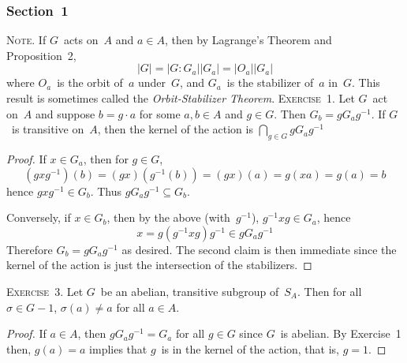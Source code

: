 \documentclass[letterpaper]{article}
\newcommand{\exercise}[1]{\goodbreak\noindent\textsc{Exercise~{#1}.}}
\newcommand{\note}{\goodbreak\noindent\textsc{Note.}}
\newcommand{\bigsect}{\bigcap}
\newcommand{\ord}[1]{|{#1}|}
\newcommand{\gindex}[2]{|{#1}:{#2}|}
\begin{document}
\subsubsection*{Section~1}
\note
If $G$~acts on~$A$ and $a\in A$, then by Lagrange's Theorem and Proposition~2,
$$\ord{G}=\gindex{G}{G_a}\ord{G_a}=\ord{O_a}\ord{G_a}$$
where $O_a$~is the orbit of~$a$ under~$G$, and $G_a$~is the stabilizer of~$a$ in~$G$. This result is sometimes called the \emph{Orbit-Stabilizer Theorem}.
\bigskip
\exercise{1}
Let $G$~act on~$A$ and suppose $b=g\cdot a$ for some $a,b\in A$ and $g\in G$. Then $G_b=gG_ag^{-1}$. If $G$~is transitive on~$A$, then the kernel of the action is $\bigsect_{g\in G}gG_ag^{-1}$
\begin{proof}
If $x\in G_a$, then for $g\in G$,
$$(gxg^{-1})(b)=(gx)(g^{-1}(b))=(gx)(a)=g(xa)=g(a)=b$$
hence $gxg^{-1}\in G_b$. Thus $gG_ag^{-1}\subseteq G_b$.

Conversely, if $x\in G_b$, then by the above (with~$g^{-1}$), $g^{-1}xg\in G_a$, hence
$$x=g(g^{-1}xg)g^{-1}\in gG_ag^{-1}$$
Therefore $G_b=gG_ag^{-1}$ as desired. The second claim is then immediate since the kernel of the action is just the intersection of the stabilizers.
\end{proof}

\exercise{3}
Let $G$~be an abelian, transitive subgroup of~$S_A$. Then for all $\sigma\in G-1$, $\sigma(a)\ne a$ for all $a\in A$.
\begin{proof}
If $a\in A$, then $gG_ag^{-1}=G_a$ for all $g\in G$ since $G$~is abelian. By Exercise~1 then, $g(a)=a$ implies that $g$~is in the kernel of the action, that is, $g=1$.
\end{proof}
\end{document}
